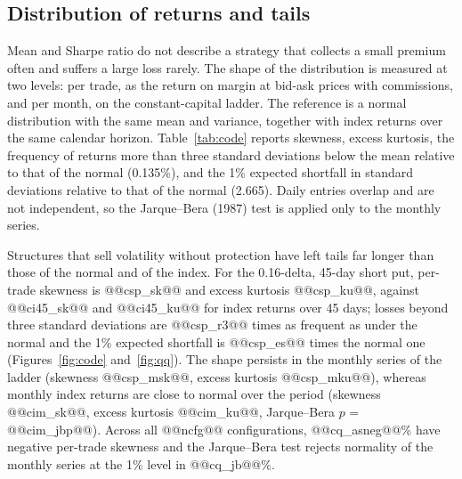 \documentclass[11pt,a4paper]{article}
\begin{document}
\subsection{Distribution of returns and tails}\label{sec:code}

Mean and Sharpe ratio do not describe a strategy that collects a small premium often and suffers a large loss rarely. The shape of the distribution is measured at two levels: per trade, as the return on margin at bid-ask prices with commissions, and per month, on the constant-capital ladder. The reference is a normal distribution with the same mean and variance, together with index returns over the same calendar horizon. Table~\ref{tab:code} reports skewness, excess kurtosis, the frequency of returns more than three standard deviations below the mean relative to that of the normal (0.135\%), and the 1\% expected shortfall in standard deviations relative to that of the normal (2.665). Daily entries overlap and are not independent, so the Jarque--Bera (1987) test is applied only to the monthly series.

\begin{table}[ht]\centering\footnotesize
\caption{Shape of the return distribution. Per trade: return on margin at bid-ask prices, commissions included; frequency of returns more than three standard deviations below the mean and 1\% expected shortfall in standard deviations, both relative to the normal; worst trade as a percentage of margin. Monthly: constant-capital ladder; $p$-value of the Jarque--Bera test. Last row: 30-day S\&P 500 returns from each session and monthly price returns.}\label{tab:code}
\end{table}

Structures that sell volatility without protection have left tails far longer than those of the normal and of the index. For the 0.16-delta, 45-day short put, per-trade skewness is @@csp_sk@@ and excess kurtosis @@csp_ku@@, against @@ci45_sk@@ and @@ci45_ku@@ for index returns over 45 days; losses beyond three standard deviations are @@csp_r3@@ times as frequent as under the normal and the 1\% expected shortfall is @@csp_es@@ times the normal one (Figures~\ref{fig:code} and~\ref{fig:qq}). The shape persists in the monthly series of the ladder (skewness @@csp_msk@@, excess kurtosis @@csp_mku@@), whereas monthly index returns are close to normal over the period (skewness @@cim_sk@@, excess kurtosis @@cim_ku@@, Jarque--Bera $p$ = @@cim_jbp@@). Across all @@ncfg@@ configurations, @@cq_asneg@@\% have negative per-trade skewness and the Jarque--Bera test rejects normality of the monthly series at the 1\% level in @@cq_jb@@\%.
\end{document}
